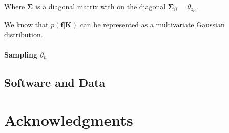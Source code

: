 \documentclass{article}
\begin{document}
Where $\bm{\Sigma}$ is a diagonal matrix with on the diagonal $\bm{\Sigma}_{ii} = \theta_{z_{ii}}$.

We know that \cite{gpml} $p(\bm{f} | \bm{K})$ can be represented as a multivariate Gaussian distribution. 


\paragraph{Sampling $\theta_n$}






\subsection{Software and Data}


\section*{Acknowledgments} 



\end{document}
